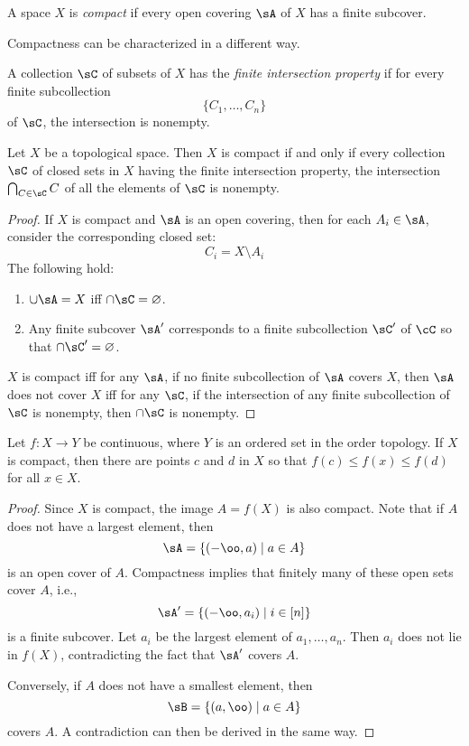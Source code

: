 \documentclass{amsart}
\begin{document}
\begin{defn}
  A space $X$ is \emph{compact} if every open covering $\sA$ of $X$ has a finite subcover.
\end{defn}

Compactness can be characterized in a different way.

\begin{defn}
  A collection $\sC$ of subsets of $X$ has the \emph{finite intersection property} if for every finite subcollection
  \[
    \{C_{1},\ldots,C_{n}\}
  \]
  of $\sC$, the intersection is nonempty.
\end{defn}

\begin{thm}
  Let $X$ be a topological space.
  Then $X$ is compact if and only if every collection $\sC$ of closed sets in $X$ having the finite intersection property, the intersection $\bigcap_{C \in \sC}C$ of all the elements of $\sC$ is nonempty.
\end{thm}
\begin{proof}
  If $X$ is compact and $\sA$ is an open covering, then for each $A_{i} \in \sA$, consider the corresponding closed set:
  \[
    C_{i} = X \setminus A_{i}
  \]
  The following hold:
  \begin{enumerate}
  \item $\cup\sA = X$ iff $\cap\sC = \varnothing$.
  \item Any finite subcover $\sA'$ corresponds to a finite subcollection $\sC'$ of $\cC$ so that $\cap\sC' = \varnothing$.
  \end{enumerate}
  $X$ is compact iff for any $\sA$, if no finite subcollection of $\sA$ covers $X$, then $\sA$ does not cover $X$ iff for any $\sC$, if the intersection of any finite subcollection of $\sC$ is nonempty, then $\cap\sC$ is nonempty.
\end{proof}

\begin{thm}
  Let $f : X \to Y$ be continuous, where $Y$ is an ordered set in the order topology.
  If $X$ is compact, then there are points $c$ and $d$ in $X$ so that $f(c) \leq f(x) \leq f(d)$ for all $x \in X$.
\end{thm}
\begin{proof}
  Since $X$ is compact, the image $A = f(X)$ is also compact.
  Note that if $A$ does not have a largest element, then
  \[
    \sA = \{(-\oo,a) \mid a \in A\}
  \]
  is an open cover of $A$.
  Compactness implies that finitely many of these open sets cover $A$, i.e.,
  \[
    \sA' = \{(-\oo,a_{i}) \mid i \in [n]\}
  \]
  is a finite subcover.
  Let $a_{i}$ be the largest element of $a_{1},\ldots,a_{n}$.
  Then $a_{i}$ does not lie in $f(X)$, contradicting the fact that $\sA'$ covers $A$.

  Conversely, if $A$ does not have a smallest element, then
  \[
    \sB = \{(a,\oo) \mid a \in A\}
  \]
  covers $A$.
  A contradiction can then be derived in the same way.
\end{proof}
\end{document}
